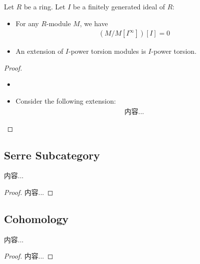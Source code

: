 \documentclass[Total.tex]{subfiles}
\begin{document}
				\begin{proposition}
					Let $R$ be a ring. Let $I$ be a finitely generated ideal of $R$:
					\begin{itemize}
						\item For any $R$-module $M$, we have
						\begin{gather*}
							(M/M[I^\infty]) [I]=0
						\end{gather*}
						\item An extension of $I$-power torsion modules is $I$-power torsion.
					\end{itemize}
				\end{proposition}
				\begin{proof}
					\begin{itemize}
						\item 
						\item Consider the following extension:
						\begin{gather*}
							内容...
						\end{gather*}
					\end{itemize}
				\end{proof}
				\subsection{Serre Subcategory}
				\begin{lemma}
					内容...
				\end{lemma}
				\begin{proof}
					内容...
				\end{proof}
				
				\subsection{Cohomology}
				\begin{proposition}
					内容...
				\end{proposition}
				\begin{proof}
					内容...
				\end{proof}
\end{document}
